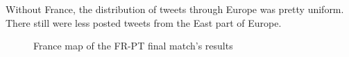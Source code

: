 \documentclass[a4paper,11pt]{report}
\begin{document}
Without France, the distribution of tweets through Europe was pretty uniform. There still were less posted tweets from the East part of Europe.
\begin{figure}[H]
\vspace{-5pt}
\begin{center}
\vspace{-20pt}
\caption{France map of the FR-PT final match's results}
\end{center}
\end{figure}
\vspace{-10pt}
\newpage
\end{document}
